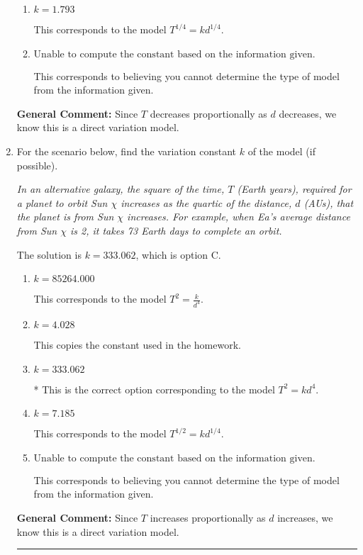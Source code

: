 \documentclass{extbook}[14pt]
\newcommand{\litem}[1]{\item #1

\rule{\textwidth}{0.4pt}}
\begin{document}
\begin{enumerate}
{\begin{enumerate}[label=\Alph*.]
* This is the correct option corresponding to the model $T^{4} = k d^{4}$.
\item \( k = 1.793 \)

This corresponds to the model $T^{1/4} = k d^{1/4}$.
\item \( \text{Unable to compute the constant based on the information given.} \)

This corresponds to believing you cannot determine the type of model from the information given.
\end{enumerate}

\textbf{General Comment:} Since $T$ decreases proportionally as $d$ decreases, we know this is a direct variation model.
}
\litem{
For the scenario below, find the variation constant $k$ of the model (if possible).

\begin{center}
    \textit{ In an alternative galaxy, the square of the time, $T$ (Earth years), required for a planet to orbit Sun $\chi$ increases as the quartic of the distance, $d$ (AUs), that the planet is from Sun $\chi$ increases. For example, when Ea's average distance from Sun $\chi$ is 2, it takes 73 Earth days to complete an orbit. }
\end{center}
The solution is \( k = 333.062 \), which is option C.\begin{enumerate}[label=\Alph*.]
\item \( k = 85264.000 \)

This corresponds to the model $T^{2} = \frac{k}{d^{4}}$.
\item \( k = 4.028 \)

This copies the constant used in the homework.
\item \( k = 333.062 \)

* This is the correct option corresponding to the model $T^{2} = k d^{4}$.
\item \( k = 7.185 \)

This corresponds to the model $T^{1/2} = k d^{1/4}$.
\item \( \text{Unable to compute the constant based on the information given.} \)

This corresponds to believing you cannot determine the type of model from the information given.
\end{enumerate}

\textbf{General Comment:} Since $T$ increases proportionally as $d$ increases, we know this is a direct variation model.
}
\end{enumerate}
\end{document}
